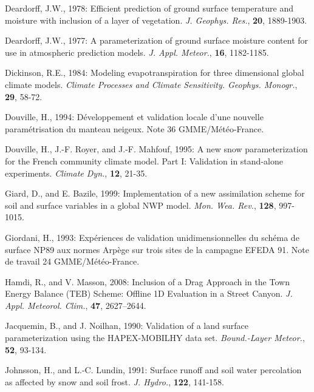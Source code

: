 \begin{description}
\item
Deardorff, J.W., 1978:
Efficient prediction of ground surface temperature and moisture
with inclusion of a layer of vegetation.
{\em J. Geophys. Res.}, {\bf 20}, 1889-1903.

\item
Deardorff, J.W., 1977:
A parameterization of ground surface moisture content for
use in atmospheric prediction models.
{\em J. Appl. Meteor.},
{\bf 16},
1182-1185.

\item
Dickinson, R.E., 1984:
Modeling evapotranspiration for three dimensional global
climate models.
{\em Climate Processes and Climate Sensitivity.
Geophys. Monogr.},
{\bf 29},
58-72.

\item
Douville, H., 1994:
D\'eveloppement et validation locale d'une nouvelle
param\'etrisation du manteau neigeux.
Note 36 GMME/M\'et\'eo-France.

\item
Douville, H., J.-F. Royer, and J.-F. Mahfouf, 1995:
A new snow parameterization for the French community climate
model.  Part I:  Validation in stand-alone experiments.
{\em Climate Dyn.}, {\bf 12}, 21-35.

\item
Giard, D., and E. Bazile, 1999:
Implementation of a new assimilation scheme for
soil and surface variables in a global NWP model.
{\em Mon. Wea. Rev.}, {\bf 128}, 997-1015.

\item
Giordani, H., 1993:
Exp\'eriences de validation unidimensionnelles du sch\'ema
de surface NP89 aux normes Arp\`ege sur trois sites de la
campagne EFEDA 91.
Note de travail 24 GMME/M\'et\'eo-France.

\item
Hamdi, R., and V. Masson, 2008:
Inclusion of a Drag Approach in the Town Energy Balance (TEB) Scheme: Offline 1D Evaluation in a Street Canyon.
{\em J. Appl. Meteorol. Clim.}, {\bf 47}, 2627–2644.

\item
Jacquemin, B., and J. Noilhan, 1990:
Validation of a land surface parameterization using the
HAPEX-MOBILHY data set.
{\em Bound.-Layer Meteor.},
{\bf 52},
93-134.

\item
Johnsson, H., and L.-C. Lundin, 1991:
Surface runoff and soil water percolation as affected by snow
and soil frost.
{\em J. Hydro.},
{\bf 122},
141-158.


\end{description}
